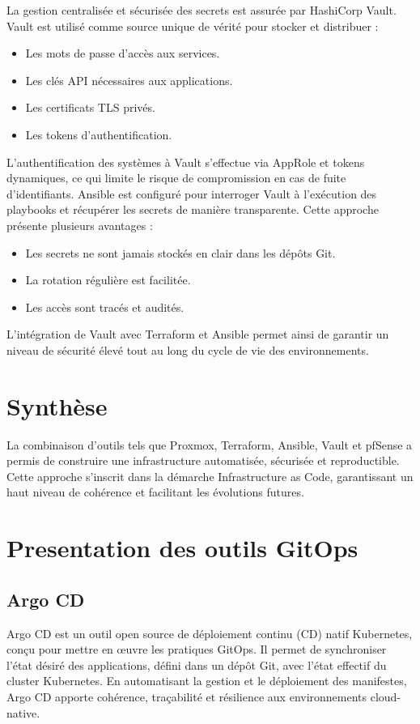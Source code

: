 La gestion centralisée et sécurisée des secrets est assurée par HashiCorp Vault.
Vault est utilisé comme source unique de vérité pour stocker et distribuer :
\begin{itemize}
	\item Les mots de passe d’accès aux services.
	\item Les clés API nécessaires aux applications.
	\item Les certificats TLS privés.
	\item Les tokens d’authentification.
\end{itemize}

L’authentification des systèmes à Vault s’effectue via AppRole et tokens dynamiques, ce qui limite le risque de compromission en cas de fuite d’identifiants.
Ansible est configuré pour interroger Vault à l’exécution des playbooks et récupérer les secrets de manière transparente.
Cette approche présente plusieurs avantages :
\begin{itemize}
	\item Les secrets ne sont jamais stockés en clair dans les dépôts Git.
	\item La rotation régulière est facilitée.
	\item Les accès sont tracés et audités.
\end{itemize}

L’intégration de Vault avec Terraform et Ansible permet ainsi de garantir un niveau de sécurité élevé tout au long du cycle de vie des environnements.

\section{Synthèse}

La combinaison d’outils tels que Proxmox, Terraform, Ansible, Vault et pfSense a permis de construire une infrastructure automatisée, sécurisée et reproductible. Cette approche s’inscrit dans la démarche Infrastructure as Code, garantissant un haut niveau de cohérence et facilitant les évolutions futures.

\section{Presentation des outils GitOps}
\subsection{Argo CD}

Argo CD est un outil open source de déploiement continu (CD) natif Kubernetes, conçu pour mettre en œuvre les pratiques GitOps. Il permet de synchroniser l’état désiré des applications, défini dans un dépôt Git, avec l’état effectif du cluster Kubernetes. En automatisant la gestion et le déploiement des manifestes, Argo CD apporte cohérence, traçabilité et résilience aux environnements cloud-native.

